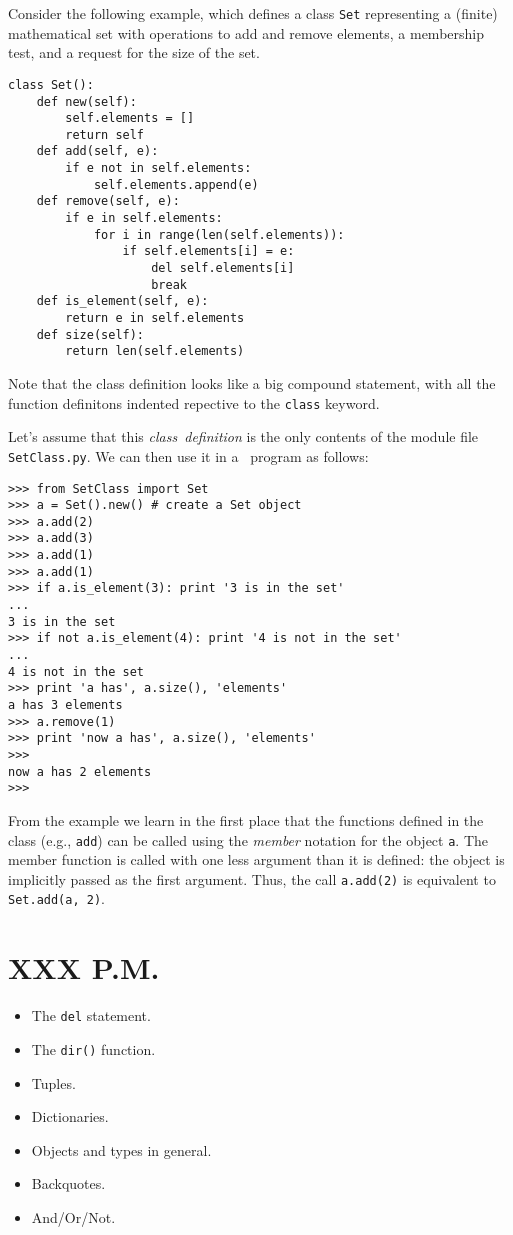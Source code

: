 Consider the following example, which defines a class {\tt Set}
representing a (finite) mathematical set with operations to add and
remove elements, a membership test, and a request for the size of the
set.
\begin{code}\begin{verbatim}
class Set():
    def new(self):
        self.elements = []
        return self
    def add(self, e):
        if e not in self.elements:
            self.elements.append(e)
    def remove(self, e):
        if e in self.elements:
            for i in range(len(self.elements)):
                if self.elements[i] = e:
                    del self.elements[i]
                    break
    def is_element(self, e):
        return e in self.elements
    def size(self):
        return len(self.elements)
\end{verbatim}\end{code}
Note that the class definition looks like a big compound statement,
with all the function definitons indented repective to the
{\tt class}
keyword.

Let's assume that this
{\it class\ definition}
is the only contents of the module file
{\tt SetClass.py}.
We can then use it in a \Python\ program as follows:
\begin{code}\begin{verbatim}
>>> from SetClass import Set
>>> a = Set().new() # create a Set object
>>> a.add(2)
>>> a.add(3)
>>> a.add(1)
>>> a.add(1)
>>> if a.is_element(3): print '3 is in the set'
... 
3 is in the set
>>> if not a.is_element(4): print '4 is not in the set'
... 
4 is not in the set
>>> print 'a has', a.size(), 'elements'
a has 3 elements
>>> a.remove(1)
>>> print 'now a has', a.size(), 'elements'
>>> 
now a has 2 elements
>>> 
\end{verbatim}\end{code}
From the example we learn in the first place that the functions defined
in the class (e.g.,
{\tt add})
can be called using the
{\it member}
notation for the object
{\tt a}.
The member function is called with one less argument than it is defined:
the object is implicitly passed as the first argument.
Thus, the call
{\tt a.add(2)}
is equivalent to
{\tt Set.add(a, 2)}.


\section{XXX P.M.}

\begin{itemize}
\item	The {\tt del} statement.
\item	The {\tt dir()} function.
\item	Tuples.
\item	Dictionaries.
\item	Objects and types in general.
\item	Backquotes.
\item	And/Or/Not.
\end{itemize}


